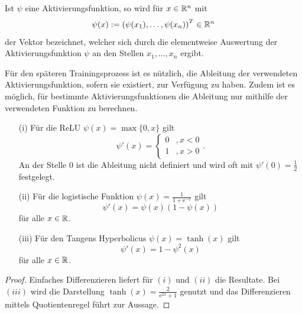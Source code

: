\begin{bem}
    Ist $\psi$ eine Aktivierungsfunktion, so wird für $x \in \mathbb{R}^n$ mit 
    \[\psi(x):=\left(\psi(x_1), \ldots, \psi(x_n)\right)^T \in \mathbb{R}^n
    \]
    der Vektor bezeichnet, welcher sich durch die elementweise Auswertung der Aktivierungsfunktion $\psi$ an den Stellen $x_1, \ldots, x_n$ ergibt. 
\end{bem}



Für den späteren Trainingsprozess ist es nützlich, die Ableitung der verwendeten Aktivierungsfunktion, sofern sie existiert, zur Verfügung zu haben. Zudem ist es möglich, für bestimmte Aktivierungsfunktionen die Ableitung nur mithilfe der verwendeten Funktion zu berechnen.

\begin{lem}
    \begin{itemize}
        \item[(i)] Für die ReLU $\psi(x)=\max\{0,x\}$ gilt
         \[\psi'(x)=\begin{cases}
            0 &, x <0 \\
            1 &, x >0
        \end{cases}. 
        \]
        An der Stelle 0 ist die Ableitung nicht definiert und wird oft mit $\psi'(0)=\frac{1}{2}$ festgelegt.
        \item[(ii)] Für die logistische Funktion $\psi(x)=\frac{1}{1+\mathrm{e}^{-x}}$ gilt
        \[ 
            \psi'(x)=\psi(x)(1-\psi(x)) 
        \]
        für alle $x \in \mathbb{R}$.
        \item[(iii)] Für den Tangens Hyperbolicus $\psi(x)=\tanh(x)$ gilt
        \[ 
            \psi'(x)=1-\psi^2(x) 
        \]
        für alle $x \in \mathbb{R}$.
    \end{itemize}
\end{lem}
\begin{proof}
    Einfaches Differenzieren liefert für $(i)$ und $(ii)$ die Resultate. Bei $(iii)$ wird die Darstellung $\tanh(x)=\frac{2}{\mathrm{e}^{2x}+1}$ genutzt und das Differenzieren mittels Quotientenregel führt zur Aussage.
\end{proof}

